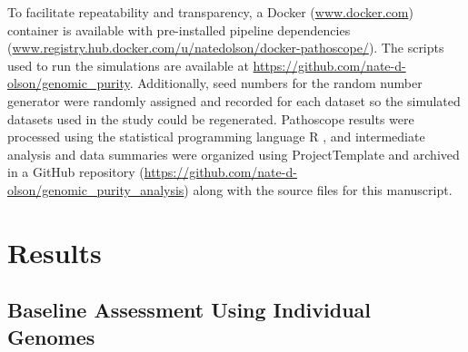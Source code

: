 \documentclass[fleqn,10pt,lineno]{wlpeerj}\usepackage[]{graphicx}\usepackage[]{color}
\begin{document}

To facilitate repeatability and transparency, a Docker (\url{www.docker.com}) container is available
with pre-installed pipeline dependencies (\url{www.registry.hub.docker.com/u/natedolson/docker-pathoscope/}).
The scripts used to run the simulations are available at \url{https://github.com/nate-d-olson/genomic_purity}.
Additionally, seed numbers for the random number generator were randomly assigned and recorded for each dataset so the simulated datasets used in the study could be regenerated.
Pathoscope results were processed using the statistical programming language R \citep{R}, and intermediate analysis and data summaries were organized using ProjectTemplate \citep{ProjectTemplate} and archived in a GitHub repository (\url{https://github.com/nate-d-olson/genomic_purity_analysis}) along with the source files for this manuscript.

\section*{Results}

\subsection*{Baseline Assessment Using Individual Genomes}
\end{document}
